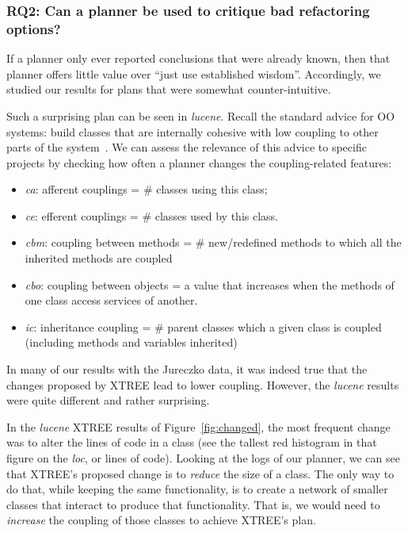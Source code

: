 \documentclass{sig-alternate}
\newcommand{\bi}{\begin{itemize}}
\newcommand{\ei}{\end{itemize}}
\newcommand{\fig}[1]{Figure~\ref{fig:#1}}
\begin{document}


\subsubsection{RQ2: Can a planner be used to critique bad refactoring options?}\label{sect:surprise}

If a planner only ever reported conclusions that were already known, then that planner offers
little value over ``just use established wisdom''. Accordingly, we studied our results
for plans that were somewhat counter-intuitive. 

Such a surprising plan can be  seen in {\em lucene}. Recall the standard advice for
OO systems: build classes that are internally cohesive with low coupling to other parts of the system~\cite{Dhama199565}. We can assess the relevance of this advice
to specific projects by checking how often a planner changes the
 coupling-related features:
\bi
\item {\em ca}:   afferent couplings  =  \# classes using this
				class;
\item {\em  	ce}:  efferent couplings =  \# classes  used by this
				  class. 
\item {\em cbm}: coupling between methods =  \# new/redefined methods
				to which all the inherited methods are coupled
\item	{\em cbo}:  coupling between objects = a value that increases when the methods of one
				class access services of another.
 
\item {\em ic}:   inheritance coupling =  \# parent classes  which a given
				class is coupled (including methods and variables inherited)
\ei
In many of our results with the Jureczko data, it was indeed true that the changes
proposed by XTREE lead to lower coupling. However, the {\em lucene} results were quite
different and rather surprising.

In the {\em lucene} XTREE results  of  \fig{changed},
the most frequent change was to alter the lines of code in a class (see the tallest
red histogram in that figure on the {\em loc}, or lines of code). 
Looking at the logs of our planner, we can see
that XTREE's proposed change is to {\em reduce} the size of a class.
The only way to do that,  while keeping the  same functionality, is to create a network
of smaller classes that interact to produce that functionality.
That is, we would need to {\em increase} the coupling of those classes to achieve XTREE's plan.
\end{document}
